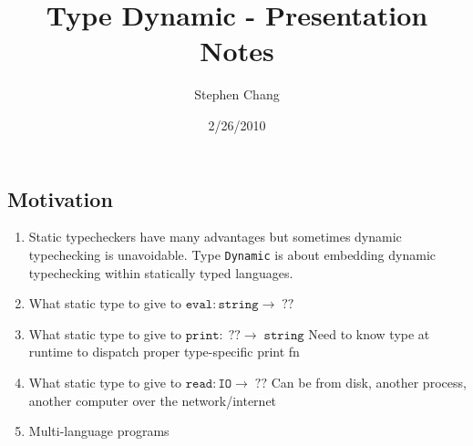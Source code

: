 \documentclass[12pt]{article}	%
\begin{document}
\newcommand{\Dynamic}{\texttt{Dynamic}\xspace}
\newcommand{\typecase}{\texttt{typecase}\xspace}
\newcommand{\dynamic}{\texttt{dynamic}\xspace}
\newcommand{\wrong}{\texttt{wrong}\xspace}
\newcommand{\deno}[1]{ \ensuremath{[\![#1]\!]} }
\newcommand{\code}[1]{$\mathtt{#1}$}
\newcommand{\pair}[2]{ \ensuremath{\left\langle #1,#2 \right\rangle} }
\newcommand{\pairtt}[2]{ \ensuremath{\left\langle \mathtt{#1,#2} \right\rangle} }


\title{Type Dynamic - Presentation Notes}
\author{Stephen Chang}
\date{2/26/2010}
\maketitle

\subsection*{Motivation}
\begin{enumerate}
	\item Static typecheckers have many advantages but sometimes dynamic typechecking is unavoidable. Type \Dynamic is about embedding dynamic typechecking within statically typed languages.
	\item What static type to give to \code{eval:string\rightarrow\;??}
	\item What static type to give to \code{print:\;??\rightarrow\;string}
	      Need to know type at runtime to dispatch proper type-specific print fn
	\item What static type to give to \code{read:IO\rightarrow\;??}
	      Can be from disk, another process, another computer over the network/internet
	\item Multi-language programs
\end{enumerate}
\end{document}
